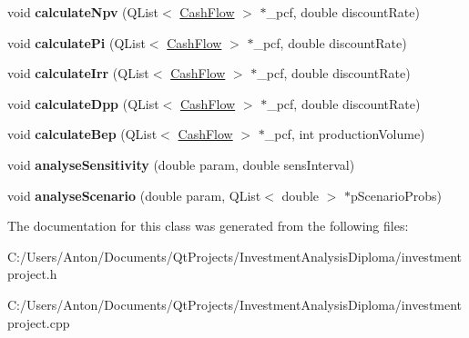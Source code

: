 \begin{DoxyCompactItemize}
\item 
\hypertarget{class_investment_project_a0944edb554c2153fc266f1d9420ab016}{}void {\bfseries calculate\+Npv} (Q\+List$<$ \hyperlink{class_cash_flow}{Cash\+Flow} $>$ $\ast$\+\_\+pcf, double discount\+Rate)\label{class_investment_project_a0944edb554c2153fc266f1d9420ab016}

\item 
\hypertarget{class_investment_project_aae3c67a4bb758ba52a91aeef72daa588}{}void {\bfseries calculate\+Pi} (Q\+List$<$ \hyperlink{class_cash_flow}{Cash\+Flow} $>$ $\ast$\+\_\+pcf, double discount\+Rate)\label{class_investment_project_aae3c67a4bb758ba52a91aeef72daa588}

\item 
\hypertarget{class_investment_project_a22b6ae8c0164f919808323ff77a1f697}{}void {\bfseries calculate\+Irr} (Q\+List$<$ \hyperlink{class_cash_flow}{Cash\+Flow} $>$ $\ast$\+\_\+pcf, double discount\+Rate)\label{class_investment_project_a22b6ae8c0164f919808323ff77a1f697}

\item 
\hypertarget{class_investment_project_af6bca31edc6407f828210bf8c56df208}{}void {\bfseries calculate\+Dpp} (Q\+List$<$ \hyperlink{class_cash_flow}{Cash\+Flow} $>$ $\ast$\+\_\+pcf, double discount\+Rate)\label{class_investment_project_af6bca31edc6407f828210bf8c56df208}

\item 
\hypertarget{class_investment_project_a53380f023f7d4b8c472c9eb32f632777}{}void {\bfseries calculate\+Bep} (Q\+List$<$ \hyperlink{class_cash_flow}{Cash\+Flow} $>$ $\ast$\+\_\+pcf, int production\+Volume)\label{class_investment_project_a53380f023f7d4b8c472c9eb32f632777}

\item 
\hypertarget{class_investment_project_a3e914c05149c640598dc694eb8460218}{}void {\bfseries analyse\+Sensitivity} (double param, double sens\+Interval)\label{class_investment_project_a3e914c05149c640598dc694eb8460218}

\item 
\hypertarget{class_investment_project_a21776d4d8f5e26fbaec62843db1b538c}{}void {\bfseries analyse\+Scenario} (double param, Q\+List$<$ double $>$ $\ast$p\+Scenario\+Probs)\label{class_investment_project_a21776d4d8f5e26fbaec62843db1b538c}

\end{DoxyCompactItemize}


The documentation for this class was generated from the following files\+:\begin{DoxyCompactItemize}
\item 
C\+:/\+Users/\+Anton/\+Documents/\+Qt\+Projects/\+Investment\+Analysis\+Diploma/investmentproject.\+h\item 
C\+:/\+Users/\+Anton/\+Documents/\+Qt\+Projects/\+Investment\+Analysis\+Diploma/investmentproject.\+cpp\end{DoxyCompactItemize}
